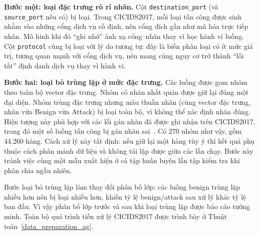 \textbf{Bước một: loại đặc trưng rò rỉ nhãn.} Cột \texttt{destination\_port} (và \texttt{source\_port} nếu có) bị loại. Trong CICIDS2017, mỗi loại tấn công được sinh nhằm vào những cổng dịch vụ cố định, nên cổng đích gần như mã hóa trực tiếp nhãn. Mô hình khi đó ``ghi nhớ'' ánh xạ cổng--nhãn thay vì học hành vi luồng. Cột \texttt{protocol} cũng bị loại với lý do tương tự: đây là biến phân loại có ít mức giá trị, tương quan mạnh với cổng dịch vụ, nên mang cùng nguy cơ trở thành ``lối tắt'' định danh dịch vụ thay vì hành vi.

\textbf{Bước hai: loại bỏ trùng lặp ở mức đặc trưng.} Các luồng được gom nhóm theo toàn bộ vector đặc trưng. Nhóm có nhãn nhất quán được giữ lại đúng một đại diện. Nhóm trùng đặc trưng nhưng mâu thuẫn nhãn (cùng vector đặc trưng, nhãn vừa Benign vừa Attack) bị loại toàn bộ, vì không thể xác định nhãn đúng. Hiện tượng này phù hợp với các lỗi gán nhãn đã được ghi nhận trên CICIDS2017, trong đó một số luồng tấn công bị gán nhãn sai~\cite{lanvin2023errors}. Có 270 nhóm như vậy, gồm 44.260 hàng. Cách xử lý này tất định: nếu giữ lại một hàng tùy ý thì kết quả phụ thuộc cách phân mảnh dữ liệu và không tái lập được giữa các lần chạy. Bước này tránh việc cùng một mẫu xuất hiện ở cả tập huấn luyện lẫn tập kiểm tra khi phân chia ngẫu nhiên.

Bước loại bỏ trùng lặp làm thay đổi phân bố lớp: các luồng benign trùng lặp nhiều hơn nên bị loại nhiều hơn, khiến tỷ lệ benign/attack sau xử lý khác tỷ lệ ban đầu. Vì vậy phân bố lớp trước và sau khi loại trùng lặp được báo cáo tường minh. Toàn bộ quá trình tiền xử lý CICIDS2017 được trình bày ở Thuật toán~\ref{data_preparation_ag}.

